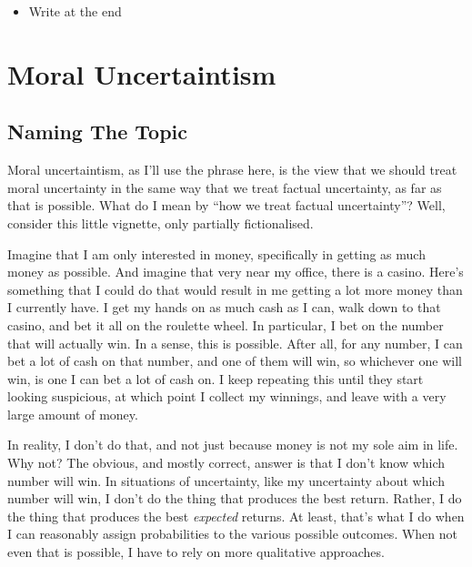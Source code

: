 \documentclass[11pt,]{book}
\providecommand{\tightlist}{%
  \setlength{\itemsep}{0pt}\setlength{\parskip}{0pt}}
\begin{document}
\begin{itemize}
\tightlist
\item
  Write at the end
\end{itemize}

\hypertarget{moral-uncertaintism}{%
\chapter{Moral Uncertaintism}\label{moral-uncertaintism}}

\hypertarget{naming-the-topic}{%
\section{Naming The Topic}\label{naming-the-topic}}

Moral uncertaintism, as I'll use the phrase here, is the view that we should treat moral uncertainty in the same way that we treat factual uncertainty, as far as that is possible. What do I mean by ``how we treat factual uncertainty''? Well, consider this little vignette, only partially fictionalised.

Imagine that I am only interested in money, specifically in getting as much money as possible. And imagine that very near my office, there is a casino. Here's something that I could do that would result in me getting a lot more money than I currently have. I get my hands on as much cash as I can, walk down to that casino, and bet it all on the roulette wheel. In particular, I bet on the number that will actually win. In a sense, this is possible. After all, for any number, I can bet a lot of cash on that number, and one of them will win, so whichever one will win, is one I can bet a lot of cash on. I keep repeating this until they start looking suspicious, at which point I collect my winnings, and leave with a very large amount of money.

In reality, I don't do that, and not just because money is not my sole aim in life. Why not? The obvious, and mostly correct, answer is that I don't know which number will win. In situations of uncertainty, like my uncertainty about which number will win, I don't do the thing that produces the best return. Rather, I do the thing that produces the best \emph{expected} returns. At least, that's what I do when I can reasonably assign probabilities to the various possible outcomes. When not even that is possible, I have to rely on more qualitative approaches.
\end{document}
